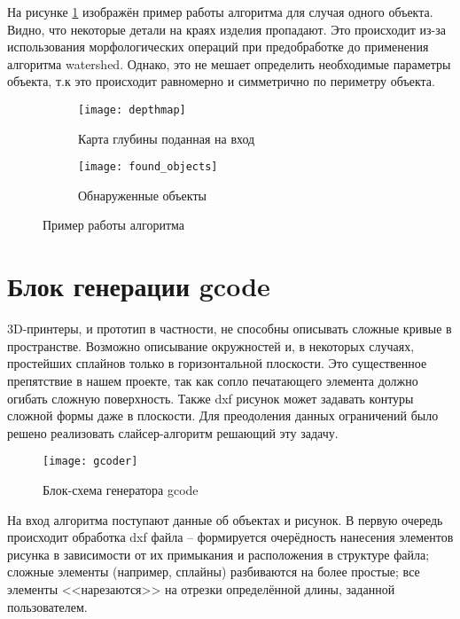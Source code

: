         На рисунке \ref{pic:contour_detection} изображён пример работы алгоритма для случая одного объекта. Видно, что некоторые детали на краях изделия пропадают. Это происходит из-за использования морфологических операций при предобработке до применения алгоритма watershed. Однако, это не мешает определить необходимые параметры объекта, т.к это происходит равномерно и симметрично по периметру объекта.
        
        \begin{figure}[H]
            \begin{subfigure}{0.5\linewidth}
                \texttt{[image: depthmap]}
                \caption{Карта глубины поданная на вход}
            \end{subfigure}
            \begin{subfigure}{0.5\linewidth}
                \texttt{[image: found\_objects]}
                \caption{Обнаруженные объекты}
            \end{subfigure}
            \caption{Пример работы алгоритма}
            \label{pic:contour_detection}
        \end{figure}
        
    \section{Блок генерации gcode}
        3D-принтеры, и прототип в частности, не способны описывать сложные кривые в пространстве. Возможно описывание окружностей и, в некоторых случаях, простейших сплайнов только в горизонтальной плоскости. Это существенное препятствие в нашем проекте, так как сопло печатающего элемента должно огибать сложную поверхность. Также dxf рисунок может задавать контуры сложной формы даже в плоскости. Для преодоления данных ограничений было решено реализовать слайсер-алгоритм решающий эту задачу.
        
        \begin{figure}[H]
            \centering
            \texttt{[image: gcoder]}
            \caption{Блок-схема генератора gcode}
            \label{pic:gcoder}
        \end{figure}
        
         На вход алгоритма поступают данные об объектах и рисунок. В первую очередь происходит обработка dxf файла -- формируется очерёдность нанесения элементов рисунка в зависимости от их примыкания и расположения в структуре файла; сложные элементы (например, сплайны) разбиваются на более простые; все элементы <<нарезаются>> на отрезки определённой длины, заданной пользователем.
         

